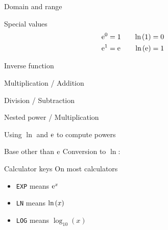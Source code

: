 \begin{multicols}{2}
\begin{FormulaBox}{Domain and range}
 \end{FormulaBox}
 \begin{FormulaBox}{Special values}
  \begin{equation*}
   \begin{aligned}
     \mathrm{e}^0 &=1  &\quad \mathrm{ln}\hspace{-0.1ex}\left(1\right) &= 0
     \\
     \mathrm{e}^1 &=\mathrm{e} &\quad \mathrm{ln}\hspace{-0.1ex}\left(\mathrm{e}\right) &=1
   \end{aligned}
  \end{equation*}
 \end{FormulaBox}
 \begin{FormulaBox}{Inverse function}
  \FormulaCompact{\me^{\LN{\Y}}}{\Y}
  \FormulaCompact{\LN{\me^{\Y}}}{\Y}
 \end{FormulaBox}
 \begin{FormulaBox}{Multiplication / Addition}
  \FormulaCompact{\me^{\THIS} \cdot \me^{\THAT}}{\me^{\THIS + \THAT}}
  \FormulaCompact{\LN{\U \cdot \V}}{\LN{\U} + \LN{\V}}
 \end{FormulaBox}
 \begin{FormulaBox}{Division / Subtraction}
  \FormulaCompact{\frac{\me^{\THIS}}{\me^{\THAT}}}{\me^{\THIS - \THAT}}
  \FormulaCompact{\LN{\frac{\Hi}{\Lo}}}{\LN{\Hi} - \LN{\Lo}}
 \end{FormulaBox}
 \begin{FormulaBox}{Nested power / Multiplication}
  \FormulaCompact{\left(\me^\N\right)^\M}{\me^{\N\cdot\M}}
  \FormulaCompact{\LN{\B^\P}}{\P\cdot\LN{\B}}
 \end{FormulaBox}
 \begin{FormulaBox}{Using $\ln$ and $\mathrm{e}$ to compute powers}
  \WithSymbolDefs{
   \begin{equation*}
    \B^\P = \me^{\P \cdot \LN{\B}}
   \end{equation*}
  }
 \end{FormulaBox}
 \begin{FormulaBox}{Base other than $\mathrm{e}$}
  Conversion to $\ln$:
  \WithSymbolDefs{
   \begin{equation*}
    \log_{\B}\left(\Y\right)
    = \frac{\LN{\Y}}{\LN{\B}}
   \end{equation*}
  }
 \end{FormulaBox}
 \begin{FormulaBox}{Calculator keys}
  On most calculators
  \begin{itemize}
  \item \texttt{EXP} means $\mathrm{e}^x$
  \item \texttt{LN} means $\mathrm{ln}\hspace{-0.1ex}\left(x\right)$
  \item \texttt{LOG} means $\log_{10}(x)$
  \end{itemize}
 \end{FormulaBox}
\end{multicols}

